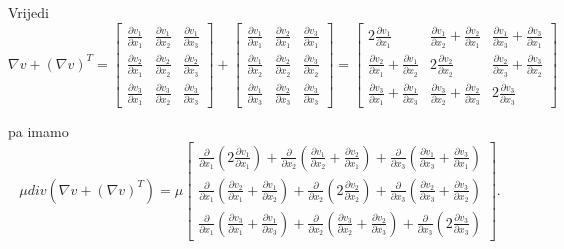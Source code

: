 \documentclass[a4paper,oneside,12pt]{memoir} %
\begin{document}
Vrijedi
\[
\nabla v + (\nabla v)^T
=
\begin{bmatrix}
    \frac{\partial v_1}{\partial x_1} &  \frac{\partial v_1}{\partial x_2} &  \frac{\partial v_1}{\partial x_3} \\
    \frac{\partial v_2}{\partial x_1} &  \frac{\partial v_2}{\partial x_2} &  \frac{\partial v_2}{\partial x_3} \\
    \frac{\partial v_3}{\partial x_1} &  \frac{\partial v_3}{\partial x_2} &  \frac{\partial v_3}{\partial x_3}
\end{bmatrix}
+
\begin{bmatrix}
    \frac{\partial v_1}{\partial x_1} &  \frac{\partial v_2}{\partial x_1} &  \frac{\partial v_3}{\partial x_1} \\
    \frac{\partial v_1}{\partial x_2} &  \frac{\partial v_2}{\partial x_2} &  \frac{\partial v_3}{\partial x_2} \\
    \frac{\partial v_1}{\partial x_3} &  \frac{\partial v_2}{\partial x_3} &  \frac{\partial v_3}{\partial x_3}
\end{bmatrix}
=
\begin{bmatrix}
    2 \frac{\partial v_1}{\partial x_1} &  \frac{\partial v_1}{\partial x_2}+\frac{\partial v_2}{\partial x_1} &  \frac{\partial v_1}{\partial x_3}+\frac{\partial v_3}{\partial x_1} \\
    \frac{\partial v_2}{\partial x_1}+\frac{\partial v_1}{\partial x_2} &  2 \frac{\partial v_2}{\partial x_2} &  \frac{\partial v_2}{\partial x_3}+\frac{\partial v_3}{\partial x_2} \\
    \frac{\partial v_3}{\partial x_1}+\frac{\partial v_1}{\partial x_3} &  \frac{\partial v_3}{\partial x_2}+\frac{\partial v_2}{\partial x_3} &  2 \frac{\partial v_3}{\partial x_3}
\end{bmatrix}
\]

pa imamo
\[
\mu div(\nabla v + (\nabla v)^T)
= \mu
\begin{bmatrix}
    \frac{\partial}{\partial x_1} (2 \frac{\partial v_1}{\partial x_1}) + \frac{\partial}{\partial x_2} (\frac{\partial v_1}{\partial x_2}+\frac{\partial v_2}{\partial x_1}) + \frac{\partial}{\partial x_3} (\frac{\partial v_1}{\partial x_3}+\frac{\partial v_3}{\partial x_1}) \\
    \frac{\partial}{\partial x_1} (\frac{\partial v_2}{\partial x_1}+\frac{\partial v_1}{\partial x_2}) + \frac{\partial}{\partial x_2} (2 \frac{\partial v_2}{\partial x_2}) + \frac{\partial}{\partial x_3} (\frac{\partial v_2}{\partial x_3}+\frac{\partial v_3}{\partial x_2}) \\
    \frac{\partial}{\partial x_1} (\frac{\partial v_3}{\partial x_1}+\frac{\partial v_1}{\partial x_3}) + \frac{\partial}{\partial x_2} (\frac{\partial v_3}{\partial x_2}+\frac{\partial v_2}{\partial x_3}) + \frac{\partial}{\partial x_3} (2 \frac{\partial v_3}{\partial x_3})
\end{bmatrix}.
\]
\end{document}
